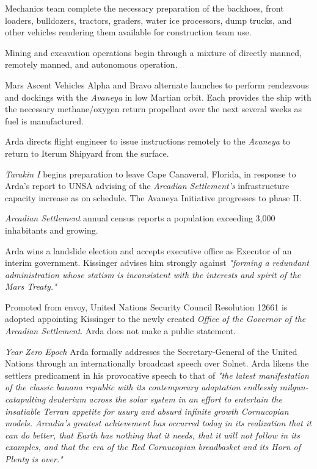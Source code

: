 Mechanics team complete the necessary preparation of the backhoes, front loaders, bulldozers, tractors, graders, water ice processors, dump trucks, and other vehicles rendering them available for construction team use.

Mining and excavation operations begin through a mixture of directly manned, remotely manned, and autonomous operation.
\StopTimelineDate

Mars Ascent Vehicles Alpha and Bravo alternate launches to perform rendezvous and dockings with the {\it Avaneya} in low Martian orbit. Each provides the ship with the necessary methane/oxygen return propellant over the next several weeks as fuel is manufactured.
\StopTimelineDate

Arda directs flight engineer to issue instructions remotely to the {\it Avaneya} to return to Iterum Shipyard from the surface.
\StopTimelineDate

{\it Tarakin I} begins preparation to leave Cape Canaveral, Florida, in response to Arda's report to UNSA advising of the {\it Arcadian Settlement's} infrastructure capacity increase as on schedule. The Avaneya Initiative progresses to phase II.
\StopTimelineDate

{\it Arcadian Settlement} annual census reports a population exceeding 3,000 inhabitants and growing.
\StopTimelineDate

Arda wins a landslide election and accepts executive office as Executor of an interim government. Kissinger advises him strongly against {\it "forming a redundant administration whose statism is inconsistent with the interests and spirit of the Mars Treaty."}
\StopTimelineDate

Promoted from envoy, United Nations Security Council Resolution 12661 is adopted appointing Kissinger to the newly created {\it Office of the Governor of the Arcadian Settlement}. Arda does not make a public statement.
\StopTimelineDate

{\it Year Zero Epoch}
Arda formally addresses the Secretary-General of the United Nations through an internationally broadcast speech over Solnet. Arda likens the settlers predicament in his provocative speech to that of {\it "the latest manifestation of the classic banana republic with its contemporary adaptation endlessly railgun-catapulting deuterium across the solar system in an effort to entertain the insatiable Terran appetite for usury and absurd infinite growth Cornucopian models. Arcadia's greatest achievement has occurred today in its realization that it can do better, that Earth has nothing that it needs, that it will not follow in its examples, and that the era of the Red Cornucopian breadbasket and its Horn of Plenty is over."}

